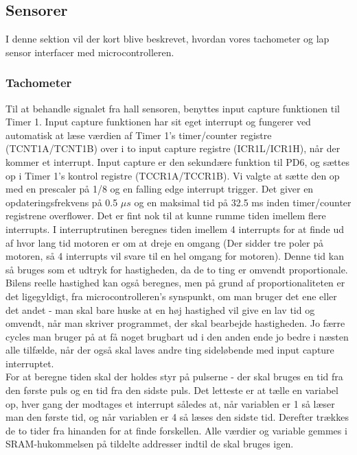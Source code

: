 \subsection{Sensorer}

I denne sektion vil der kort blive beskrevet, hvordan vores tachometer og lap sensor interfacer med microcontrolleren.

\subsubsection{Tachometer}

Til at behandle signalet fra hall sensoren, benyttes input capture funktionen til Timer 1. Input capture funktionen har sit eget interrupt og fungerer ved automatisk at læse værdien af Timer 1's timer/counter registre (TCNT1A/TCNT1B) over i to input capture registre (ICR1L/ICR1H), når der kommer et interrupt. Input capture er den sekundære funktion til PD6, og sættes op i Timer 1's kontrol registre (TCCR1A/TCCR1B). Vi valgte at sætte den op med en prescaler på 1/8 og en falling edge interrupt trigger. Det giver en opdateringsfrekvens på 0.5 $\mu s$ og en maksimal tid på 32.5 ms inden timer/counter registrene overflower. Det er fint nok til at kunne rumme tiden imellem flere interrupts. I interruptrutinen beregnes tiden imellem 4 interrupts for at finde ud af hvor lang tid motoren er om at dreje en omgang (Der sidder tre poler på motoren, så 4 interrupts vil svare til en hel omgang for motoren). Denne tid kan så bruges som et udtryk for hastigheden, da de to ting er omvendt proportionale. Bilens reelle hastighed kan også beregnes, men på grund af proportionaliteten er det ligegyldigt, fra microcontrolleren's synspunkt, om man bruger det ene eller det andet - man skal bare huske at en høj hastighed vil give en lav tid og omvendt, når man skriver programmet, der skal bearbejde hastigheden. Jo færre cycles man bruger på at få noget brugbart ud i den anden ende jo bedre i næsten alle tilfælde, når der også skal laves andre ting sideløbende med input capture interruptet.\\
For at beregne tiden skal der holdes styr på pulserne - der skal bruges en tid fra den første puls og en tid fra den sidste puls. Det letteste er at tælle en variabel op, hver gang der modtages et interrupt således at, når variablen er 1 så læser man den første tid, og når variablen er 4 så læses den sidste tid. Derefter trækkes de to tider fra hinanden for at finde forskellen. Alle værdier og variable gemmes i SRAM-hukommelsen på tildelte addresser indtil de skal bruges igen.\\

